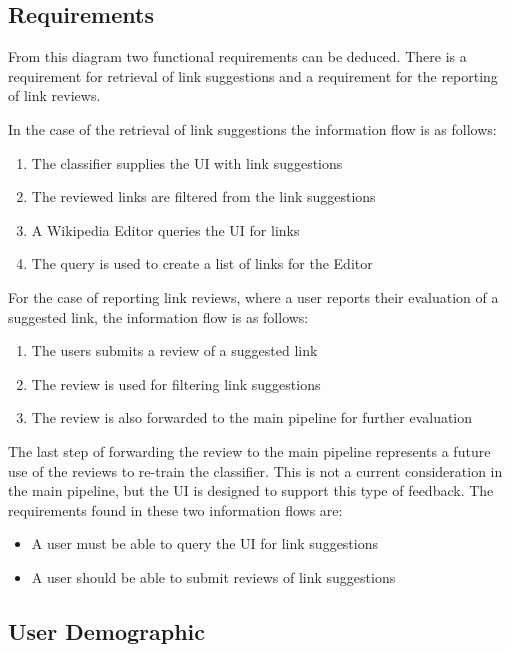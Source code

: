 \subsection{Requirements}

From this diagram two functional requirements can be deduced. There is a requirement for retrieval of link suggestions and a requirement for the reporting of link reviews.

In the case of the retrieval of link suggestions the information flow is as follows:

\begin{enumerate}
	\item The classifier supplies the UI with link suggestions
	\item The reviewed links are filtered from the link suggestions
	\item A Wikipedia Editor queries the UI for links
	\item The query is used to create a list of links for the Editor
\end{enumerate}

For the case of reporting link reviews, where a user reports their evaluation of a suggested link, the information flow is as follows:

\begin{enumerate}
	\item The users submits a review of a suggested link
	\item The review is used for filtering link suggestions
	\item The review is also forwarded to the main pipeline for further evaluation
\end{enumerate}

The last step of forwarding the review to the main pipeline represents a future use of the reviews to re-train the classifier. This is not a current consideration in the main pipeline, but the UI is designed to support this type of feedback. The requirements found in these two information flows are:

\begin{itemize}
	\item A user must be able to query the UI for link suggestions
	\item A user should be able to submit reviews of link suggestions
\end{itemize}

\subsection{User Demographic}

